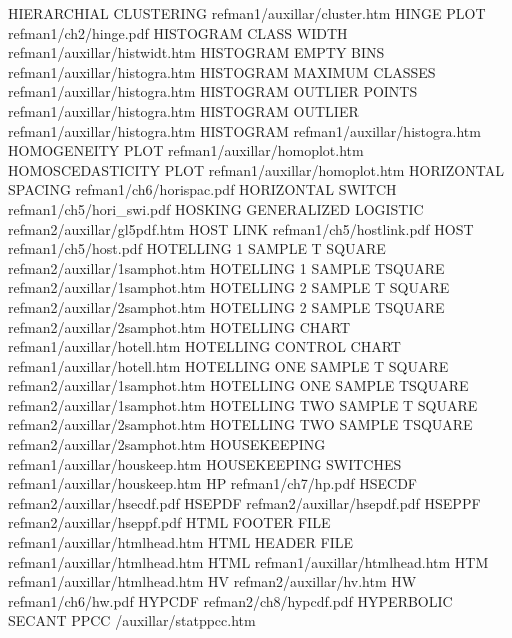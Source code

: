 HIERARCHIAL CLUSTERING                  refman1/auxillar/cluster.htm
HINGE PLOT                              refman1/ch2/hinge.pdf
HISTOGRAM CLASS WIDTH                   refman1/auxillar/histwidt.htm
HISTOGRAM EMPTY BINS                    refman1/auxillar/histogra.htm
HISTOGRAM MAXIMUM CLASSES               refman1/auxillar/histogra.htm
HISTOGRAM OUTLIER POINTS                refman1/auxillar/histogra.htm
HISTOGRAM OUTLIER                       refman1/auxillar/histogra.htm
HISTOGRAM                               refman1/auxillar/histogra.htm
HOMOGENEITY PLOT                        refman1/auxillar/homoplot.htm
HOMOSCEDASTICITY PLOT                   refman1/auxillar/homoplot.htm
HORIZONTAL SPACING                      refman1/ch6/horispac.pdf
HORIZONTAL SWITCH                       refman1/ch5/hori_swi.pdf
HOSKING GENERALIZED LOGISTIC            refman2/auxillar/gl5pdf.htm
HOST LINK                               refman1/ch5/hostlink.pdf
HOST                                    refman1/ch5/host.pdf
HOTELLING 1 SAMPLE T SQUARE             refman2/auxillar/1samphot.htm
HOTELLING 1 SAMPLE TSQUARE              refman2/auxillar/1samphot.htm
HOTELLING 2 SAMPLE T SQUARE             refman2/auxillar/2samphot.htm
HOTELLING 2 SAMPLE TSQUARE              refman2/auxillar/2samphot.htm
HOTELLING CHART                         refman1/auxillar/hotell.htm
HOTELLING CONTROL CHART                 refman1/auxillar/hotell.htm
HOTELLING ONE SAMPLE T SQUARE           refman2/auxillar/1samphot.htm
HOTELLING ONE SAMPLE TSQUARE            refman2/auxillar/1samphot.htm
HOTELLING TWO SAMPLE T SQUARE           refman2/auxillar/2samphot.htm
HOTELLING TWO SAMPLE TSQUARE            refman2/auxillar/2samphot.htm
HOUSEKEEPING                            refman1/auxillar/houskeep.htm
HOUSEKEEPING SWITCHES                   refman1/auxillar/houskeep.htm
HP                                      refman1/ch7/hp.pdf
HSECDF                                  refman2/auxillar/hsecdf.pdf
HSEPDF                                  refman2/auxillar/hsepdf.pdf
HSEPPF                                  refman2/auxillar/hseppf.pdf
HTML FOOTER FILE                        refman1/auxillar/htmlhead.htm
HTML HEADER FILE                        refman1/auxillar/htmlhead.htm
HTML                                    refman1/auxillar/htmlhead.htm
HTM                                     refman1/auxillar/htmlhead.htm
HV                                      refman2/auxillar/hv.htm
HW                                      refman1/ch6/hw.pdf
HYPCDF                                  refman2/ch8/hypcdf.pdf
HYPERBOLIC SECANT PPCC                  /auxillar/statppcc.htm
